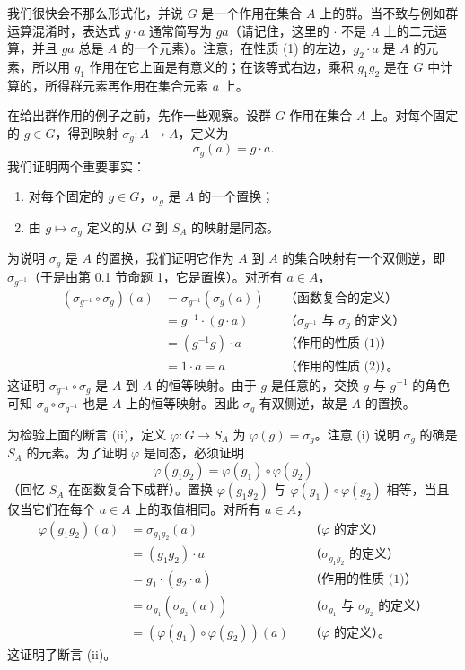 我们很快会不那么形式化，并说 $G$ 是一个作用在集合 $A$ 上的群。当不致与例如群运算混淆时，表达式 $g\cdot a$ 通常简写为 $ga$（请记住，这里的 $\cdot$ 不是 $A$ 上的二元运算，并且 $ga$ 总是 $A$ 的一个元素）。注意，在性质 (1) 的左边，$g_2\cdot a$ 是 $A$ 的元素，所以用 $g_1$ 作用在它上面是有意义的；在该等式右边，乘积 $g_1g_2$ 是在 $G$ 中计算的，所得群元素再作用在集合元素 $a$ 上。

在给出群作用的例子之前，先作一些观察。设群 $G$ 作用在集合 $A$ 上。对每个固定的 $g\in G$，得到映射 $\sigma_g:A\to A$，定义为
\[
  \sigma_g(a)=g\cdot a.
\]
我们证明两个重要事实：
\begin{enumerate}[label=(\roman*)]
  \item 对每个固定的 $g\in G$，$\sigma_g$ 是 $A$ 的一个置换；
  \item 由 $g\mapsto\sigma_g$ 定义的从 $G$ 到 $S_A$ 的映射是同态。
\end{enumerate}

为说明 $\sigma_g$ 是 $A$ 的置换，我们证明它作为 $A$ 到 $A$ 的集合映射有一个双侧逆，即 $\sigma_{g^{-1}}$（于是由第 0.1 节命题 1，它是置换）。对所有 $a\in A$，
\begin{align*}
  (\sigma_{g^{-1}}\circ\sigma_g)(a)
  &=\sigma_{g^{-1}}(\sigma_g(a)) &&\text{（函数复合的定义）}\\
  &=g^{-1}\cdot(g\cdot a) &&\text{（$\sigma_{g^{-1}}$ 与 $\sigma_g$ 的定义）}\\
  &=(g^{-1}g)\cdot a &&\text{（作用的性质 (1)）}\\
  &=1\cdot a=a &&\text{（作用的性质 (2)）。}
\end{align*}
这证明 $\sigma_{g^{-1}}\circ\sigma_g$ 是 $A$ 到 $A$ 的恒等映射。由于 $g$ 是任意的，交换 $g$ 与 $g^{-1}$ 的角色可知 $\sigma_g\circ\sigma_{g^{-1}}$ 也是 $A$ 上的恒等映射。因此 $\sigma_g$ 有双侧逆，故是 $A$ 的置换。

为检验上面的断言 (ii)，定义 $\varphi:G\to S_A$ 为 $\varphi(g)=\sigma_g$。注意 (i) 说明 $\sigma_g$ 的确是 $S_A$ 的元素。为了证明 $\varphi$ 是同态，必须证明
\[
  \varphi(g_1g_2)=\varphi(g_1)\circ\varphi(g_2)
\]
（回忆 $S_A$ 在函数复合下成群）。置换 $\varphi(g_1g_2)$ 与 $\varphi(g_1)\circ\varphi(g_2)$ 相等，当且仅当它们在每个 $a\in A$ 上的取值相同。对所有 $a\in A$，
\begin{align*}
  \varphi(g_1g_2)(a)
  &=\sigma_{g_1g_2}(a) &&\text{（$\varphi$ 的定义）}\\
  &=(g_1g_2)\cdot a &&\text{（$\sigma_{g_1g_2}$ 的定义）}\\
  &=g_1\cdot(g_2\cdot a) &&\text{（作用的性质 (1)）}\\
  &=\sigma_{g_1}(\sigma_{g_2}(a)) &&\text{（$\sigma_{g_1}$ 与 $\sigma_{g_2}$ 的定义）}\\
  &=(\varphi(g_1)\circ\varphi(g_2))(a) &&\text{（$\varphi$ 的定义）。}
\end{align*}
这证明了断言 (ii)。

